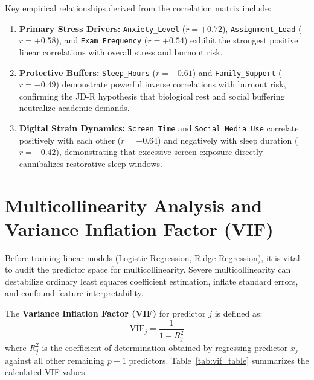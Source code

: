 \documentclass[12pt,a4paper,oneside]{report}
\begin{document}
Key empirical relationships derived from the correlation matrix include:
\begin{enumerate}
    \item \textbf{Primary Stress Drivers:} \texttt{Anxiety\_Level} ($r = +0.72$), \texttt{Assignment\_Load} ($r = +0.58$), and \texttt{Exam\_Frequency} ($r = +0.54$) exhibit the strongest positive linear correlations with overall stress and burnout risk.
    \item \textbf{Protective Buffers:} \texttt{Sleep\_Hours} ($r = -0.61$) and \texttt{Family\_Support} ($r = -0.49$) demonstrate powerful inverse correlations with burnout risk, confirming the JD-R hypothesis that biological rest and social buffering neutralize academic demands.
    \item \textbf{Digital Strain Dynamics:} \texttt{Screen\_Time} and \texttt{Social\_Media\_Use} correlate positively with each other ($r = +0.64$) and negatively with sleep duration ($r = -0.42$), demonstrating that excessive screen exposure directly cannibalizes restorative sleep windows.
\end{enumerate}

\section{Multicollinearity Analysis and Variance Inflation Factor (VIF)}
\label{sec:vif_analysis}
Before training linear models (Logistic Regression, Ridge Regression), it is vital to audit the predictor space for multicollinearity. Severe multicollinearity can destabilize ordinary least squares coefficient estimation, inflate standard errors, and confound feature interpretability. 

The \textbf{Variance Inflation Factor (VIF)} for predictor $j$ is defined as:
\begin{equation}
    \text{VIF}_j = \frac{1}{1 - R_j^2}
    \label{eq:vif_formula}
\end{equation}
where $R_j^2$ is the coefficient of determination obtained by regressing predictor $x_j$ against all other remaining $p-1$ predictors. Table~\ref{tab:vif_table} summarizes the calculated VIF values.
\end{document}
